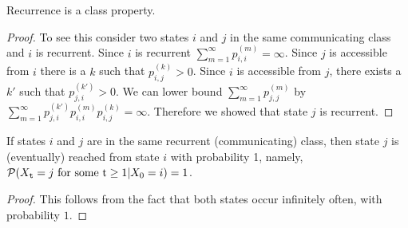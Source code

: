 %
%
%
%
%

\begin{claim}
Recurrence is a class property.
\end{claim}
\begin{proof}
    To see this consider two states $i$ and $j$ in the same communicating class and $i$ is recurrent. Since $i$ is recurrent
$\sum\nolimits_{m = 1}^\infty {p_{i,i}^{(m)}}  = \infty $. Since $j$
is accessible from $i$ there is a $k$ such that $p_{i,j}^{(k)}
>0$. Since $i$ is accessible from $j$, there exists a $k'$ such that
$p_{j,i}^{(k')}>0$. We can lower bound $\sum\nolimits_{m = 1}^\infty
{p_{j,j}^{(m)}}$ by $\sum_{m = 1}^\infty
{p_{j,i}^{(k')}}{p_{i,i}^{(m)}} {p_{i,j}^{(k)}} = \infty $.
Therefore we showed that state $j$ is recurrent.
\end{proof}


\begin{claim}
If states $i$ and $j$ are in the same recurrent (communicating)
class, then state $j$ is (eventually) reached from state $i$ with
probability 1, namely,  ${\cal P}({X_{\tt t}} = j{\textrm{ for some t}} \ge
1|{X_0} = i) = 1$.    
\end{claim}
\begin{proof}
This follows from the fact that both states occur infinitely often,
with probability $1$.
\end{proof}

